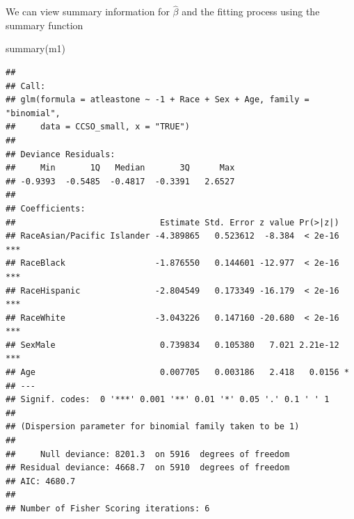 \documentclass[
  ignorenonframetext,
]{beamer}
\newenvironment{Shaded}{\begin{snugshade}}{\end{snugshade}}
\newcommand{\FunctionTok}[1]{\textcolor[rgb]{0.00,0.00,0.00}{#1}}
\newcommand{\NormalTok}[1]{#1}
\begin{document}
\begin{frame}[fragile]{}
\protect\hypertarget{section-7}{}
We can view summary information for \(\hat\beta\) and the fitting
process using the summary function

\tiny

\begin{Shaded}
\begin{Highlighting}[]
\FunctionTok{summary}\NormalTok{(m1)}
\end{Highlighting}
\end{Shaded}

\begin{verbatim}
## 
## Call:
## glm(formula = atleastone ~ -1 + Race + Sex + Age, family = "binomial", 
##     data = CCSO_small, x = "TRUE")
## 
## Deviance Residuals: 
##     Min       1Q   Median       3Q      Max  
## -0.9393  -0.5485  -0.4817  -0.3391   2.6527  
## 
## Coefficients:
##                             Estimate Std. Error z value Pr(>|z|)    
## RaceAsian/Pacific Islander -4.389865   0.523612  -8.384  < 2e-16 ***
## RaceBlack                  -1.876550   0.144601 -12.977  < 2e-16 ***
## RaceHispanic               -2.804549   0.173349 -16.179  < 2e-16 ***
## RaceWhite                  -3.043226   0.147160 -20.680  < 2e-16 ***
## SexMale                     0.739834   0.105380   7.021 2.21e-12 ***
## Age                         0.007705   0.003186   2.418   0.0156 *  
## ---
## Signif. codes:  0 '***' 0.001 '**' 0.01 '*' 0.05 '.' 0.1 ' ' 1
## 
## (Dispersion parameter for binomial family taken to be 1)
## 
##     Null deviance: 8201.3  on 5916  degrees of freedom
## Residual deviance: 4668.7  on 5910  degrees of freedom
## AIC: 4680.7
## 
## Number of Fisher Scoring iterations: 6
\end{verbatim}
\end{frame}
\end{document}
